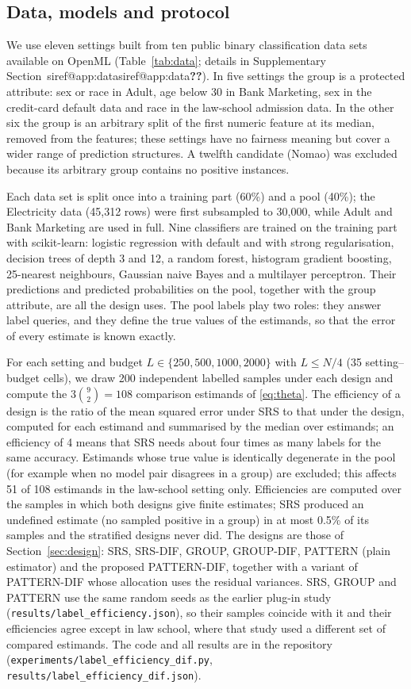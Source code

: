 \documentclass[pdflatex,sn-mathphys-num,iicol]{sn-jnl}
\makeatletter
\theoremstyle{thmstyleone}
\theoremstyle{thmstyletwo}
\theoremstyle{thmstylethree}
\newcommand{\SIref}[1]{\ifcsname siref@#1\endcsname\csname siref@#1\endcsname\else\textbf{??}\fi}
\makeatother
\begin{document}
\subsection{Data, models and protocol}
We use eleven settings built from ten public binary classification data sets available on OpenML (Table~\ref{tab:data}; details in Supplementary Section~\SIref{app:data}). In five settings the group is a protected attribute: sex or race in Adult, age below 30 in Bank Marketing, sex in the credit-card default data and race in the law-school admission data. In the other six the group is an arbitrary split of the first numeric feature at its median, removed from the features; these settings have no fairness meaning but cover a wider range of prediction structures. A twelfth candidate (Nomao) was excluded because its arbitrary group contains no positive instances.

Each data set is split once into a training part (60\%) and a pool (40\%); the Electricity data (45,312 rows) were first subsampled to 30,000, while Adult and Bank Marketing are used in full. Nine classifiers are trained on the training part with scikit-learn: logistic regression with default and with strong regularisation, decision trees of depth 3 and 12, a random forest, histogram gradient boosting, 25-nearest neighbours, Gaussian naive Bayes and a multilayer perceptron. Their predictions and predicted probabilities on the pool, together with the group attribute, are all the design uses. The pool labels play two roles: they answer label queries, and they define the true values of the estimands, so that the error of every estimate is known exactly.

For each setting and budget $L\in\{250,500,1000,2000\}$ with $L\le N/4$ (35 setting--budget cells), we draw 200 independent labelled samples under each design and compute the $3\binom{9}{2}=108$ comparison estimands of \eqref{eq:theta}. The efficiency of a design is the ratio of the mean squared error under SRS to that under the design, computed for each estimand and summarised by the median over estimands; an efficiency of 4 means that SRS needs about four times as many labels for the same accuracy. Estimands whose true value is identically degenerate in the pool (for example when no model pair disagrees in a group) are excluded; this affects 51 of 108 estimands in the law-school setting only. Efficiencies are computed over the samples in which both designs give finite estimates; SRS produced an undefined estimate (no sampled positive in a group) in at most 0.5\% of its samples and the stratified designs never did. The designs are those of Section~\ref{sec:design}: SRS, SRS-DIF, GROUP, GROUP-DIF, PATTERN (plain estimator) and the proposed PATTERN-DIF, together with a variant of PATTERN-DIF whose allocation uses the residual variances. SRS, GROUP and PATTERN use the same random seeds as the earlier plug-in study (\texttt{results/label\_efficiency.json}), so their samples coincide with it and their efficiencies agree except in law school, where that study used a different set of compared estimands. The code and all results are in the repository (\texttt{experiments/label\_efficiency\_dif.py}, \texttt{results/label\_efficiency\_dif.json}).
\end{document}
